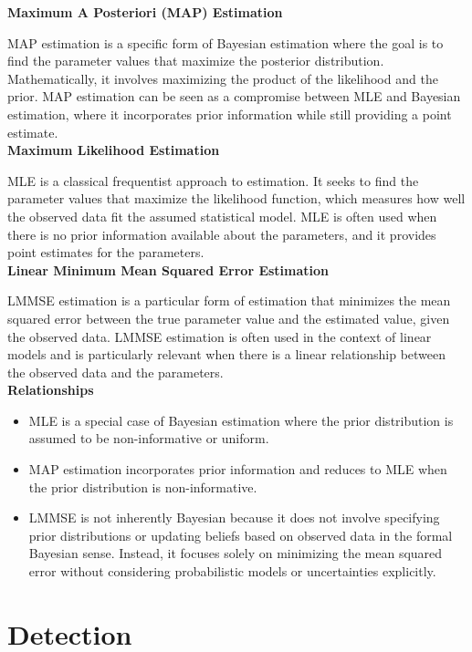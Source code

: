 \documentclass[12pt]{book}
\theoremstyle{definition}
\begin{document}
\textbf{Maximum A Posteriori (MAP) Estimation}

MAP estimation is a specific form of Bayesian estimation where the goal is to find the parameter values that maximize the posterior distribution. Mathematically, it involves maximizing the product of the likelihood and the prior.
MAP estimation can be seen as a compromise between MLE and Bayesian estimation, where it incorporates prior information while still providing a point estimate.\\

\textbf{Maximum Likelihood Estimation}

MLE is a classical frequentist approach to estimation. It seeks to find the parameter values that maximize the likelihood function, which measures how well the observed data fit the assumed statistical model.
MLE is often used when there is no prior information available about the parameters, and it provides point estimates for the parameters.\\




\textbf{Linear Minimum Mean Squared Error Estimation}

LMMSE estimation is a particular form of estimation that minimizes the mean squared error between the true parameter value and the estimated value, given the observed data.
LMMSE estimation is often used in the context of linear models and is particularly relevant when there is a linear relationship between the observed data and the parameters.\\

\textbf{Relationships}

\begin{itemize}
    \item MLE is a special case of Bayesian estimation where the prior distribution is assumed to be non-informative or uniform.
    \item MAP estimation incorporates prior information and reduces to MLE when the prior distribution is non-informative.
    \item LMMSE is not inherently Bayesian because it does not involve specifying prior distributions or updating beliefs based on observed data in the formal Bayesian sense. Instead, it focuses solely on minimizing the mean squared error without considering probabilistic models or uncertainties explicitly.
\end{itemize}

\chapter{Detection}
\end{document}

